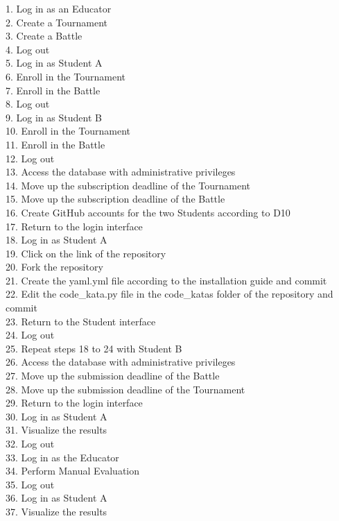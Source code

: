 \documentclass{Configuration_Files/Template}
\begin{document}
\begin{itemize}
\begin{enumerate}
            1. Log in as an Educator\\
            2. Create a Tournament\\
            3. Create a Battle\\
            4. Log out\\
            5. Log in as Student A\\
            6. Enroll in the Tournament\\
            7. Enroll in the Battle\\
            8. Log out\\
            9. Log in as Student B\\
            10. Enroll in the Tournament\\
            11. Enroll in the Battle\\
            12. Log out\\
            13. Access the database with administrative privileges\\
            14. Move up the subscription deadline of the Tournament\\
            15. Move up the subscription deadline of the Battle\\
            16. Create GitHub accounts for the two Students according to D10\\
            17. Return to the login interface\\
            18. Log in as Student A\\
            19. Click on the link of the repository\\
            20. Fork the repository\\
            21. Create the yaml.yml file according to the installation guide and commit\\
            22. Edit the code\_kata.py file in the code\_katas folder of the repository and commit\\
            23. Return to the Student interface\\
            24. Log out\\
            25. Repeat steps 18 to 24 with Student B\\
            26. Access the database with administrative privileges\\
            27. Move up the submission deadline of the Battle\\
            28. Move up the submission deadline of the Tournament\\
            29. Return to the login interface\\
            30. Log in as Student A\\
            31. Visualize the results\\
            32. Log out\\
            33. Log in as the Educator\\
            34. Perform Manual Evaluation\\
            35. Log out\\
            36. Log in as Student A\\
            37. Visualize the results\\
        

\end{enumerate}
\end{itemize}
\end{document}
